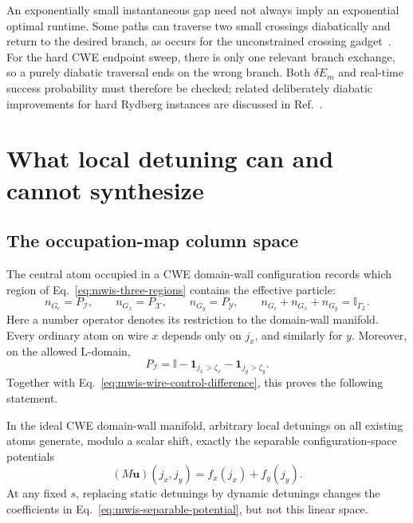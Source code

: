 An exponentially small instantaneous gap need not always imply an
exponential optimal runtime.  Some paths can traverse two small crossings
diabatically and return to the desired branch, as occurs for the unconstrained
crossing gadget~\cite{bombieri2025quantum}.  For the hard CWE endpoint sweep,
there is only one relevant branch exchange, so a purely diabatic traversal
ends on the wrong branch.  Both $\delta E_m$ and real-time success probability
must therefore be checked; related deliberately diabatic improvements for
hard Rydberg instances are discussed in Ref.~\cite{schiffer2024circumventing}.

\section{What local detuning can and cannot synthesize}
\label{sec:mwis-control-space}

\subsection{The occupation-map column space}

The central atom occupied in a CWE domain-wall configuration records which
region of Eq.~\eqref{eq:mwis-three-regions} contains the effective particle:
\begin{equation}
 n_{G_c}=P_{\mathcal I},\qquad
 n_{G_x}=P_{\mathcal X},\qquad
 n_{G_y}=P_{\mathcal Y},\qquad
 n_{G_c}+n_{G_x}+n_{G_y}=\mathbb I_{\Gamma_L}.
 \label{eq:mwis-gadget-region-projectors}
\end{equation}
Here a number operator denotes its restriction to the domain-wall manifold.
Every ordinary atom on wire $x$ depends only on $j_x$, and similarly for
$y$.  Moreover, on the allowed L-domain,
\begin{equation}
 P_{\mathcal I}
 =\mathbb I-\mathbf 1_{j_x>\zeta_x}-\mathbf 1_{j_y>\zeta_y}.
 \label{eq:mwis-inner-separable}
\end{equation}
Together with Eq.~\eqref{eq:mwis-wire-control-difference}, this proves the
following statement.

\begin{lemma}
\label{lem:mwis-separable-control}
In the ideal CWE domain-wall manifold, arbitrary local detunings on all
existing atoms generate, modulo a scalar shift, exactly the separable
configuration-space potentials
\begin{equation}
 (M\mathbf u)(j_x,j_y)=f_x(j_x)+f_y(j_y).
 \label{eq:mwis-separable-potential}
\end{equation}
At any fixed $s$, replacing static detunings by dynamic detunings changes the
coefficients in Eq.~\eqref{eq:mwis-separable-potential}, but not this linear
space.
\end{lemma}

